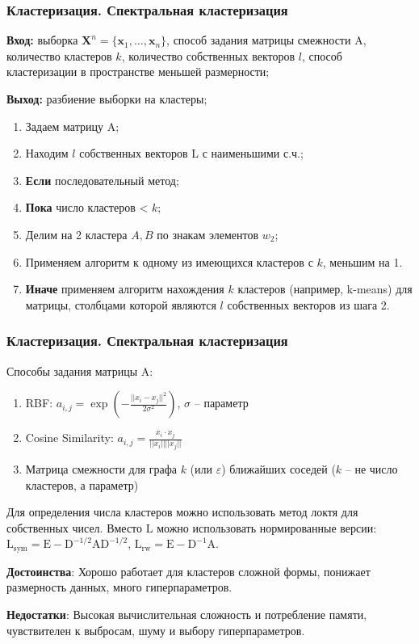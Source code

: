 \documentclass[notheorems, handout]{beamer}
\begin{document}
	\begin{frame}
	\frametitle{Кластеризация. Спектральная кластеризация}
	\textbf{Вход:} выборка $\pmb X^{n} = \{\pmb x_1, \dots, \pmb x_{n}\}$, способ задания матрицы смежности $\mathrm{A}$, количество кластеров $k$, количество собственных векторов $l$, способ кластеризации в пространстве меньшей размерности;

	\textbf{Выход:} разбиение выборки на кластеры;
	\begin{enumerate}
	\item Задаем матрицу $\mathrm{A}$; 
	\item Находим $l$ собственных векторов $\mathrm{L}$ с наименьшими с.ч.; 
	\item \textbf{Если} последовательный метод;
	\item \quad \textbf{Пока} число кластеров < $k$; 
	\item \quad \quad Делим на 2 кластера $A, B$ по знакам элементов $w_2$;
	\item \quad \quad Применяем алгоритм к одному из имеющихся кластеров с $k$, меньшим на 1.
	\item \textbf{Иначе} применяем алгоритм нахождения $k$ кластеров (например, k-means) для матрицы, столбцами которой являются $l$ собственных векторов из шага 2.
	\end{enumerate}
	\end{frame}
	
	\begin{frame}
	\frametitle{Кластеризация. Спектральная кластеризация}
	Способы задания матрицы $\textrm{A}$:
	\begin{enumerate}
	\item RBF: $a_{i,j}=\exp(-\frac{||x_i-x_j||^2}{2\sigma^2})$, $\sigma$ -- параметр
	\item Cosine Similarity: $a_{i,j}=\frac{x_i\cdot x_j}{||x_i||||x_j||}$
	\item Матрица смежности для графа $k$ (или $\varepsilon$) ближайших соседей ($k$ -- не число кластеров, а параметр)
	\end{enumerate}
	Для определения числа кластеров можно использовать метод локтя для собственных чисел. Вместо $\mathrm{L}$ можно использовать нормированные версии:
	$\mathrm{L_{sym}}=\mathrm{E}-\mathrm{D}^{-1/2}\mathrm{A}\mathrm{D}^{-1/2}$,
	$\mathrm{L_{rw}}=\mathrm{E}-\mathrm{D}^{-1}\mathrm{A}$.
	
	\textbf{Достоинства}: Хорошо работает для кластеров сложной формы, понижает размерность данных, много гиперпараметров.
	
	\textbf{Недостатки}: Высокая вычислительная сложность и потребление памяти, чувствителен к выбросам, шуму и выбору гиперпараметров. 
	\end{frame}
	
\end{document}
